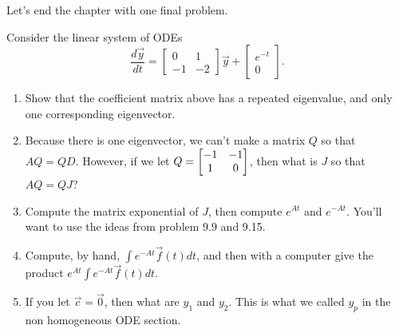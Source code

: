 Let's end the chapter with one final problem.
\begin{problem}
Consider the linear system of ODEs
$$
\frac{d\vec y}{dt}
=
\begin{bmatrix}
 0&1\\-1&-2
\end{bmatrix}
\vec y +
\begin{bmatrix}
 e^{-t}\\0
\end{bmatrix}
.$$
\begin{enumerate}
\item Show that the coefficient matrix above has a repeated eigenvalue, and only one corresponding eigenvector.  
\item Because there is one eigenvector, we can't make a matrix $Q$ so that $AQ=QD$.  However, if we let $Q=\begin{bmatrix} -1&-1\\1&0 \end{bmatrix}$, then what is $J$ so that $AQ=QJ$?
\item Compute the matrix exponential of $J$, then compute $e^{At}$ and $e^{-At}$. You'll want to use the ideas from problem 9.9 and 9.15.
\item Compute, by hand, $\int e^{-At}\vec f(t) dt$, and then with a computer give the product $e^{At}\int e^{-At}\vec f(t) dt$. 
 \item If you let $\vec c=\vec 0$, then what are $y_1$ and $y_2$.  This is what we called $y_p$ in the non homogeneous ODE section. 
\end{enumerate}
\end{problem}
























